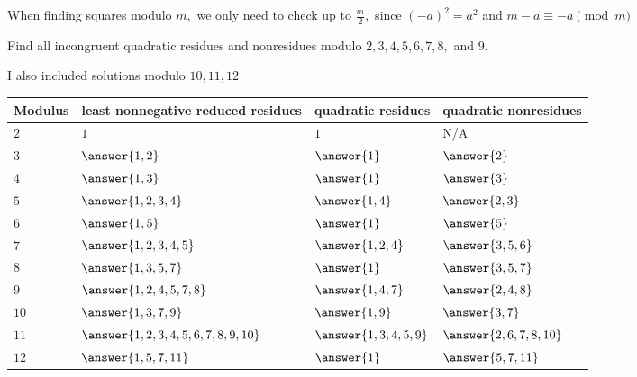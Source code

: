\documentclass[letterpaper, 11 pt]{ximera}
\theoremstyle{definition}
\begin{document}
\begin{remark}
    When finding squares modulo $m,$ we only need to check up to $\frac{m}{2},$ since $(-a)^2=a^2$ and $m-a\equiv -a\pmod{m}$
\end{remark}

\begin{br}
    Find all incongruent quadratic residues and nonresidues modulo $2,3,4,5,6,7,8,$ and $9$.


    \begin{solution}
        I also included solutions modulo $10,11,12$

        \begin{tabular}{p{1.5cm}|p{4cm}p{3cm}p{3cm}}
            Modulus & least nonnegative reduced residues & quadratic residues & quadratic nonresidues \\\hline
            $2$ & $1$   
                & $1$ 
                & N/A \\
            $3$ & $\answer{1,2}$ 
                & $\answer{1}$
                & $\answer{2}$\\
            $4$ & $\answer{1,3}$ 
                & $\answer{1}$
                & $\answer{3}$\\
            $5$ & $\answer{1,2,3,4}$
                & $\answer{1,4}$
                & $\answer{2,3}$\\
            $6$ & $\answer{1,5}$
                & $\answer{1}$
                & $\answer{5}$\\
            $7$ & $\answer{1,2,3,4,5}$
                & $\answer{1,2,4}$
                & $\answer{3,5,6}$\\
            $8$ & $\answer{1,3,5,7}$
                & $\answer{1}$
                & $\answer{3,5,7}$\\
            $9$ & $\answer{1,2,4,5,7,8}$
                & $\answer{1,4,7}$
                & $\answer{2,4,8}$\\
            $10$ & $\answer{1,3,7,9}$
                & $\answer{1,9}$
                & $\answer{3,7}$\\
            $11$ & $\answer{1,2,3,4,5,6,7,8,9,10}$
                & $\answer{1,3,4,5,9}$
                & $\answer{2,6,7,8,10}$\\
            $12$ & $\answer{1,5,7,11}$
                & $\answer{1}$
                & $\answer{5,7,11}$\\
        \end{tabular}
    \end{solution}
\end{br}
\end{document}
